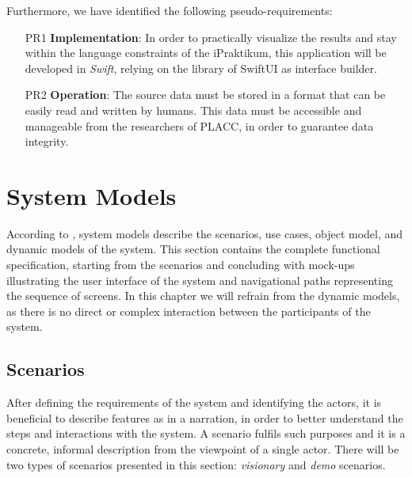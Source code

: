Furthermore, we have identified the following pseudo-requirements:

\begin{itemize}
\item [PR1] \textbf{Implementation}: In order to practically visualize the results and stay within the language constraints of the iPraktikum, this application will be developed in \textit{Swift},  relying on the library of SwiftUI as interface builder.
\item [PR2] \textbf{Operation}: The source data must be stored in a format that can be easily read and written by humans.  This data must be accessible and manageable from the researchers of PLACC, in order to guarantee data integrity.
\end{itemize}


\section{System Models} \label{SystemModels}


According to \cite{bruegge2004object}, system models describe the scenarios, use cases, object model, and dynamic models of the system. This section contains the complete functional specification,  starting from the scenarios and concluding with mock-ups illustrating the user interface of the system and navigational paths representing the sequence of screens.  In this chapter we will refrain from the dynamic models, as there is no direct or complex interaction between the participants of the system.

\subsection{Scenarios}


After defining the requirements of the system and identifying the actors,  it is beneficial to describe features as in a narration, in order to better understand the steps and interactions with the system.  A scenario fulfils such purposes and it is a concrete, informal description from the viewpoint of a single actor. There will be two types of scenarios presented in this section: \textit{visionary} and \textit{demo} scenarios.

